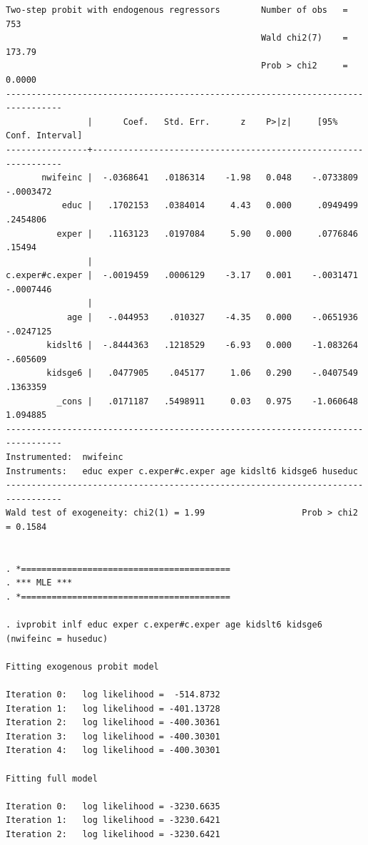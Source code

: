 \begin{verbatim}
Two-step probit with endogenous regressors        Number of obs   =        753
                                                  Wald chi2(7)    =     173.79
                                                  Prob > chi2     =     0.0000
---------------------------------------------------------------------------------
                |      Coef.   Std. Err.      z    P>|z|     [95% Conf. Interval]
----------------+----------------------------------------------------------------
       nwifeinc |  -.0368641   .0186314    -1.98   0.048    -.0733809   -.0003472
           educ |   .1702153   .0384014     4.43   0.000     .0949499    .2454806
          exper |   .1163123   .0197084     5.90   0.000     .0776846      .15494
                |
c.exper#c.exper |  -.0019459   .0006129    -3.17   0.001    -.0031471   -.0007446
                |
            age |   -.044953    .010327    -4.35   0.000    -.0651936   -.0247125
        kidslt6 |  -.8444363   .1218529    -6.93   0.000    -1.083264    -.605609
        kidsge6 |   .0477905    .045177     1.06   0.290    -.0407549    .1363359
          _cons |   .0171187   .5498911     0.03   0.975    -1.060648    1.094885
---------------------------------------------------------------------------------
Instrumented:  nwifeinc
Instruments:   educ exper c.exper#c.exper age kidslt6 kidsge6 huseduc
---------------------------------------------------------------------------------
Wald test of exogeneity: chi2(1) = 1.99                   Prob > chi2 = 0.1584


. *=========================================
. *** MLE ***
. *=========================================

. ivprobit inlf educ exper c.exper#c.exper age kidslt6 kidsge6 (nwifeinc = huseduc)

Fitting exogenous probit model

Iteration 0:   log likelihood =  -514.8732  
Iteration 1:   log likelihood = -401.13728  
Iteration 2:   log likelihood = -400.30361  
Iteration 3:   log likelihood = -400.30301  
Iteration 4:   log likelihood = -400.30301  

Fitting full model

Iteration 0:   log likelihood = -3230.6635  
Iteration 1:   log likelihood = -3230.6421  
Iteration 2:   log likelihood = -3230.6421  


\end{verbatim}
